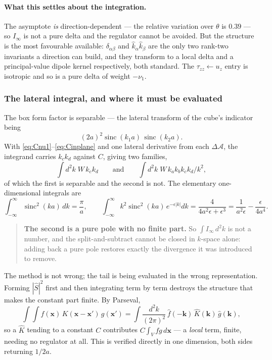 \documentclass[11pt,a4paper]{article}
\newcommand{\dA}{\Delta\mathcal{A}}
\begin{document}
\paragraph{What this settles about the integration.}  The asymptote \emph{is}
direction-dependent --- the relative variation over $\theta$ is $0.39$ --- so
$I_\infty$ is not a pure delta and the regulator cannot be avoided.  But the
structure is the most favourable available: $\delta_{\alpha\beta}$ and
$\hat{k}_\alpha\hat{k}_\beta$ are the only two rank-two invariants a direction
can build, and they transform to a local delta and a principal-value dipole
kernel respectively, both standard.  The $\tau_{zz}\!\leftarrow\!u_z$ entry is
isotropic and so is a pure delta of weight $-\nu_1$.

\subsubsection{The lateral integral, and where it must be evaluated}

The box form factor is separable --- the lateral transform of the cube's
indicator being
\[
  (2a)^2\operatorname{sinc}(k_1a)\,\operatorname{sinc}(k_2a) .
\]
With \eqref{eq:Cnu1}--\eqref{eq:Cinplane} and one lateral derivative from each
$\dA$, the integrand carries $k_ck_d$ against $C$, giving two families,
\[
  \int d^2k\;W\,k_ck_d
  \qquad\text{and}\qquad
  \int d^2k\;W\,k_ak_bk_ck_d/k^2 ,
\]
of which the first is separable and the second is not.  The elementary
one-dimensional integrals are
\begin{equation}\label{eq:sincints}
  \int_{-\infty}^{\infty}\!\operatorname{sinc}^2(ka)\,dk = \frac{\pi}{a},
  \qquad
  \int_{-\infty}^{\infty}\!k^2\operatorname{sinc}^2(ka)\,e^{-\epsilon|k|}dk
  = \frac{4}{4a^2\epsilon + \epsilon^3}
  = \frac{1}{a^2\epsilon} - \frac{\epsilon}{4a^4} .
\end{equation}

\begin{quote}
\textbf{The second is a pure pole with no finite part.}  So
$\int I_\infty\,d^2k$ is not a number, and the split-and-subtract cannot be
closed in $k$-space alone: adding back a pure pole restores exactly the
divergence it was introduced to remove.
\end{quote}

The method is not wrong; the tail is being evaluated in the wrong
representation.  Forming $|\widehat{S}|^2$ first and then integrating term by
term destroys the structure that makes the constant part finite.  By Parseval,
\begin{equation}\label{eq:parseval}
  \int\!\!\int f(\mathbf{x})\,K(\mathbf{x}-\mathbf{x}')\,g(\mathbf{x}')
  = \int\!\frac{d^2k}{(2\pi)^2}\,\widehat{f}(-\mathbf{k})\,
      \widehat{K}(\mathbf{k})\,\widehat{g}(\mathbf{k}),
\end{equation}
so a $\widehat{K}$ tending to a constant $C$ contributes
$C\!\int_V\! f g\,d\mathbf{x}$ --- a \emph{local} term, finite, needing no
regulator at all.  This is verified directly in one dimension, both sides
returning $1/2a$.
\end{document}
